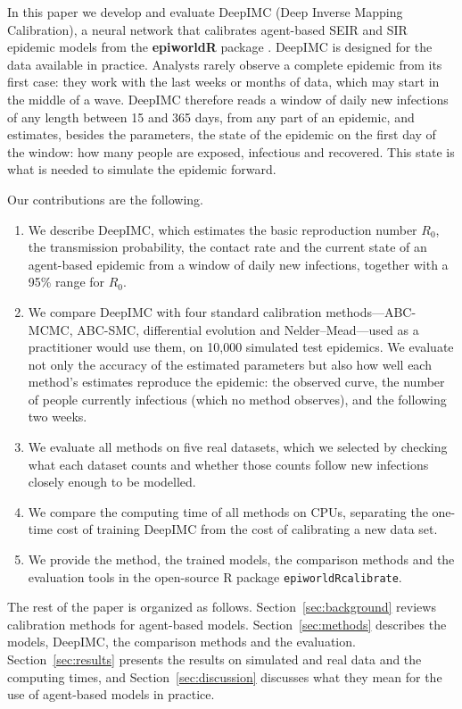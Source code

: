 \documentclass[12pt]{article}
\begin{document}
In this paper we develop and evaluate DeepIMC (Deep Inverse Mapping Calibration), a neural network
that calibrates agent-based SEIR and SIR epidemic models from the \textbf{epiworldR} package
\autocite{meyerEpiworldRFastAgentBased2023}. DeepIMC is designed for the data available in
practice. Analysts rarely observe a complete epidemic from its first case: they work with the last
weeks or months of data, which may start in the middle of a wave. DeepIMC therefore reads a window
of daily new infections of any length between 15 and 365 days, from any part of an epidemic, and
estimates, besides the parameters, the state of the epidemic on the first day of the window: how
many people are exposed, infectious and recovered. This state is what is needed to simulate the
epidemic forward.

Our contributions are the following.
\begin{enumerate}[leftmargin=*]
\item We describe DeepIMC, which estimates the basic reproduction number $R_0$, the transmission
probability, the contact rate and the current state of an agent-based epidemic from a window of
daily new infections, together with a 95\% range for $R_0$.
\item We compare DeepIMC with four standard calibration methods---ABC-MCMC, ABC-SMC, differential
evolution and Nelder--Mead---used as a practitioner would use them, on 10,000 simulated test
epidemics. We evaluate not only the accuracy of the estimated parameters but also how well each
method's estimates reproduce the epidemic: the observed curve, the number of people currently
infectious (which no method observes), and the following two weeks.
\item We evaluate all methods on five real datasets, which we selected by checking what each
dataset counts and whether those counts follow new infections closely enough to be modelled.
\item We compare the computing time of all methods on CPUs, separating the one-time cost of
training DeepIMC from the cost of calibrating a new data set.
\item We provide the method, the trained models, the comparison methods and the evaluation tools in
the open-source R package \texttt{epiworldRcalibrate}.
\end{enumerate}

The rest of the paper is organized as follows. Section~\ref{sec:background} reviews calibration
methods for agent-based models. Section~\ref{sec:methods} describes the models, DeepIMC, the
comparison methods and the evaluation. Section~\ref{sec:results} presents the results on simulated
and real data and the computing times, and Section~\ref{sec:discussion} discusses what they mean
for the use of agent-based models in practice.
\end{document}
